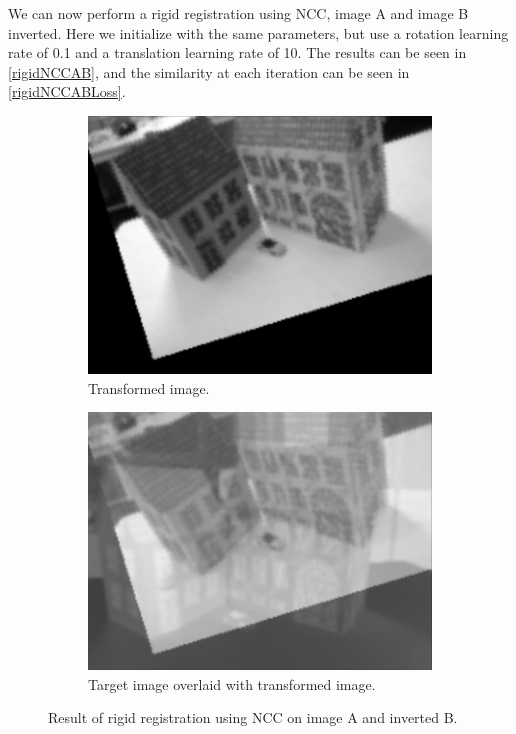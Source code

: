 We can now perform a rigid registration using NCC, image A and image B inverted. Here we initialize with the same parameters, but use a rotation learning rate of 0.1 and a translation learning rate of 10. The results can be seen in \autoref{rigidNCCAB}, and the similarity at each iteration can be seen in \autoref{rigidNCCABLoss}.

\begin{figure}[h]
	\centering
	\begin{subfigure}{0.4\linewidth}
		\centering
		\includegraphics[width=\linewidth]{Materials/rigidNCCAB}
		\caption{Transformed image.\newline}
	\end{subfigure}
	\hspace{1cm}
	\begin{subfigure}{0.4\linewidth}
		\centering
		\includegraphics[width=\linewidth]{Materials/rigidNCCABO}
		\caption{Target image overlaid with transformed image.}
	\end{subfigure}
	\caption{Result of rigid registration using NCC on image A and inverted B.}
	\label{rigidNCCAB}
\end{figure}
